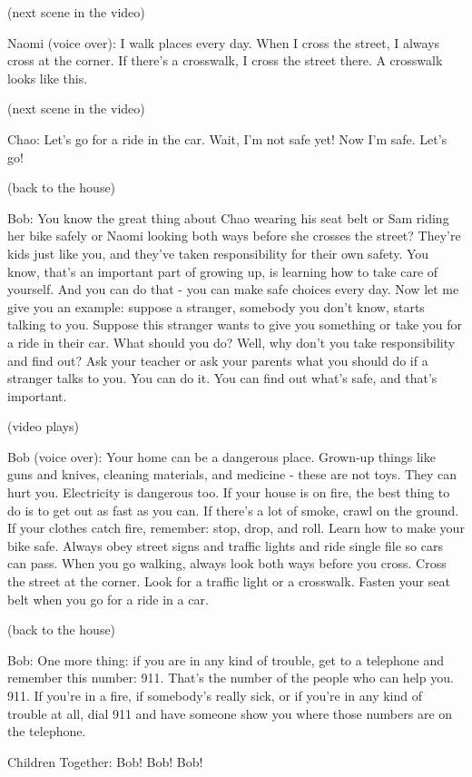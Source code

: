 (next scene in the video)

Naomi (voice over): I walk places every day. When I cross the street, I always cross at the corner. If there's a crosswalk, I cross the street there. A crosswalk looks like this.

(next scene in the video)

Chao: Let's go for a ride in the car. Wait, I'm not safe yet! Now I'm safe. Let's go!

(back to the house)

Bob: You know the great thing about Chao wearing his seat belt or Sam riding her bike safely or Naomi looking both ways before she crosses the street? They're kids just like you, and they've taken responsibility for their own safety. You know, that's an important part of growing up, is learning how to take care of yourself. And you can do that - you can make safe choices every day. Now let me give you an example: suppose a stranger, somebody you don't know, starts talking to you. Suppose this stranger wants to give you something or take you for a ride in their car. What should you do? Well, why don't you take responsibility and find out? Ask your teacher or ask your parents what you should do if a stranger talks to you. You can do it. You can find out what's safe, and that's important.

(video plays)

Bob (voice over): Your home can be a dangerous place. Grown-up things like guns and knives, cleaning materials, and medicine - these are not toys. They can hurt you. Electricity is dangerous too. If your house is on fire, the best thing to do is to get out as fast as you can. If there's a lot of smoke, crawl on the ground. If your clothes catch fire, remember: stop, drop, and roll. Learn how to make your bike safe. Always obey street signs and traffic lights and ride single file so cars can pass. When you go walking, always look both ways before you cross. Cross the street at the corner. Look for a traffic light or a crosswalk. Fasten your seat belt when you go for a ride in a car.

(back to the house)

Bob: One more thing: if you are in any kind of trouble, get to a telephone and remember this number: 911. That's the number of the people who can help you. 911. If you're in a fire, if somebody's really sick, or if you're in any kind of trouble at all, dial 911 and have someone show you where those numbers are on the telephone.

Children Together: Bob! Bob! Bob!

